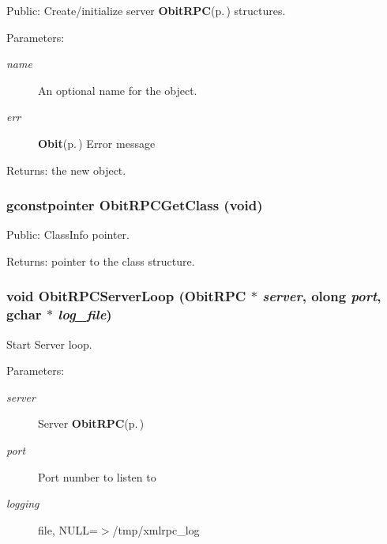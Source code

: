 Public: Create/initialize server {\bf Obit\-RPC}{\rm (p.\,\pageref{structObitRPC})} structures. 

\begin{Desc}
\item[Parameters:]
\begin{description}
\item[{\em name}]An optional name for the object. \item[{\em err}]{\bf Obit}{\rm (p.\,\pageref{structObit})} Error message \end{description}
\end{Desc}
\begin{Desc}
\item[Returns:]the new object. \end{Desc}
\subsubsection{\setlength{\rightskip}{0pt plus 5cm}gconstpointer Obit\-RPCGet\-Class (void)}\label{ObitRPC_8h_a19}


Public: Class\-Info pointer. 

\begin{Desc}
\item[Returns:]pointer to the class structure. \end{Desc}
\subsubsection{\setlength{\rightskip}{0pt plus 5cm}void Obit\-RPCServer\-Loop ({\bf Obit\-RPC} $\ast$ {\em server}, {\bf olong} {\em port}, gchar $\ast$ {\em log\_\-file})}\label{ObitRPC_8h_a24}


Start Server loop. 

\begin{Desc}
\item[Parameters:]
\begin{description}
\item[{\em server}]Server {\bf Obit\-RPC}{\rm (p.\,\pageref{structObitRPC})} \item[{\em port}]Port number to listen to \item[{\em logging}]file, NULL=$>$/tmp/xmlrpc\_\-log \end{description}
\end{Desc}
